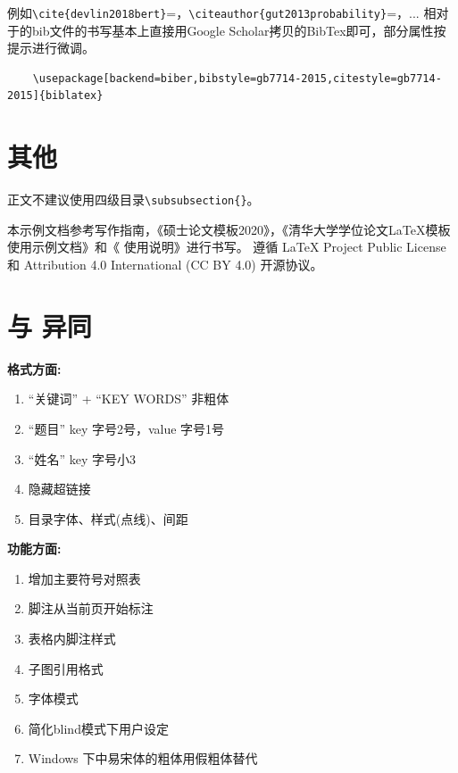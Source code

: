 例如\verb|\cite{devlin2018bert}|=\cite{devlin2018bert}，\verb|\citeauthor{gut2013probability}|=\citeauthor{gut2013probability}，...
相对于的bib文件的书写基本上直接用Google Scholar拷贝的BibTex即可，部分属性按提示进行微调。
\begin{Verbatim}
    \usepackage[backend=biber,bibstyle=gb7714-2015,citestyle=gb7714-2015]{biblatex}
\end{Verbatim}

\section{其他}
\label{sec:other}

正文不建议使用四级目录\verb|\subsubsection{}|。

本示例文档参考写作指南，《硕士论文模板2020》，《清华大学学位论文\LaTeX{}模板使用示例文档》和《\pkuthss{} 使用说明》进行书写。
遵循 \LaTeX{} Project Public License 和 Attribution 4.0 International (CC BY 4.0) 开源协议。

\section{与\pkuthss{} \iofubaseversion{}异同}

\textbf{格式方面:}

\begin{enumerate}
    \item ``关键词” + ``KEY WORDS” 非粗体 
    \item ``题目” key 字号2号，value 字号1号
    \item ``姓名” key 字号小3
    \item 隐藏超链接
    \item 目录字体、样式(点线)、间距
\end{enumerate}

\textbf{功能方面:}

\begin{enumerate}
    \item 增加主要符号对照表
    \item 脚注从当前页开始标注
    \item 表格内脚注样式
    \item 子图引用格式
    \item 字体模式
    \item 简化blind模式下用户设定
    \item Windows 下中易宋体的粗体用假粗体替代
\end{enumerate}
